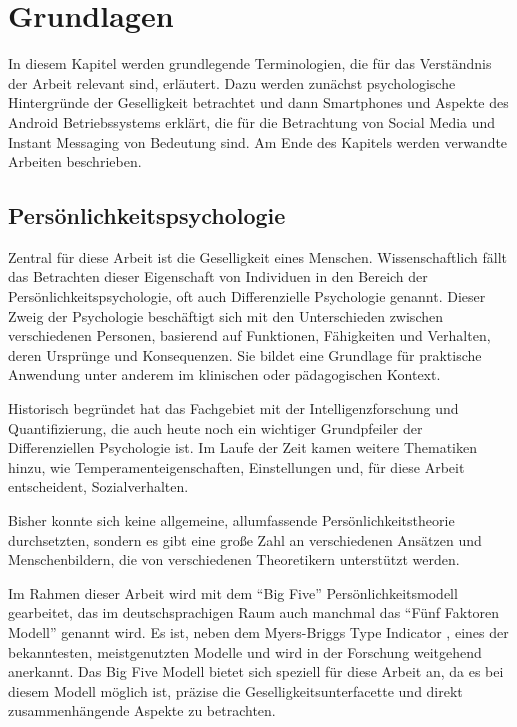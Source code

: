 
\chapter{Grundlagen}
\label{ch:Grundlagen}

In diesem Kapitel werden grundlegende Terminologien, die für das Verständnis der Arbeit relevant sind, erläutert.
Dazu werden zunächst psychologische Hintergründe der Geselligkeit betrachtet und
dann Smartphones und Aspekte des Android Betriebssystems erklärt, die für die Betrachtung von Social Media und Instant Messaging von Bedeutung sind.
Am Ende des Kapitels werden verwandte Arbeiten beschrieben.

\section{Persönlichkeitspsychologie}
\label{ch:Grundlagen:sec:Abschnitt1}

Zentral für diese Arbeit ist die Geselligkeit eines Menschen.
Wissenschaftlich fällt das Betrachten dieser Eigenschaft von Individuen in den Bereich der Persönlichkeitspsychologie,
oft auch Differenzielle Psychologie genannt. 
Dieser Zweig der Psychologie beschäftigt sich mit den Unterschieden zwischen verschiedenen Personen, 
basierend auf Funktionen, Fähigkeiten und Verhalten, deren Ursprünge und Konsequenzen.
Sie bildet eine Grundlage für praktische Anwendung unter anderem im klinischen oder pädagogischen Kontext.
\par

Historisch begründet hat das Fachgebiet mit der Intelligenzforschung und Quantifizierung, 
die auch heute noch ein wichtiger Grundpfeiler der Differenziellen Psychologie ist.
Im Laufe der Zeit kamen weitere Thematiken hinzu, wie Temperamenteigenschaften, Einstellungen und, für diese Arbeit entscheident, Sozialverhalten.
\par

Bisher konnte sich keine allgemeine, allumfassende Persönlichkeitstheorie durchsetzten, sondern es gibt eine große Zahl an verschiedenen Ansätzen und Menschenbildern, die von verschiedenen Theoretikern unterstützt werden.
Im Rahmen dieser Arbeit wird mit dem "`Big Five"' Persönlichkeitsmodell gearbeitet, das im deutschsprachigen Raum auch manchmal das "`Fünf Faktoren Modell"' genannt wird.
Es ist, neben dem Myers-Briggs Type Indicator \cite{briggs1980gifts}, eines der bekanntesten, meistgenutzten Modelle und wird in der Forschung weitgehend anerkannt.
Das Big Five Modell bietet sich speziell für diese Arbeit an, da es bei diesem Modell möglich ist, präzise die Geselligkeitsunterfacette und direkt zusammenhängende Aspekte zu betrachten.

